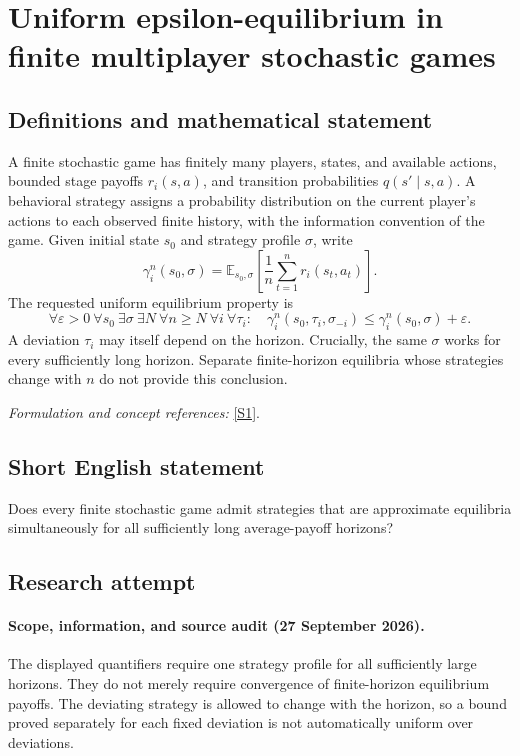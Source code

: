 \documentclass[11pt]{article}
\begin{document}
\section*{\texorpdfstring{Uniform epsilon-equilibrium in finite multiplayer stochastic games}{Uniform epsilon-equilibrium in finite multiplayer stochastic games}}\label{30006946}
\subsection{Definitions and mathematical statement}
A finite stochastic game has finitely many players, states, and available actions, bounded stage payoffs $r_i(s,a)$, and transition probabilities $q(s'\mid s,a)$. A behavioral strategy assigns a probability distribution on the current player's actions to each observed finite history, with the information convention of the game. Given initial state $s_0$ and strategy profile $\sigma$, write
\[
 \gamma_i^n(s_0,\sigma)={\mathbb{E}}_{s_0,\sigma}
 \left[\frac1n\sum_{t=1}^n r_i(s_t,a_t)\right].
\]
The requested uniform equilibrium property is
\[
 \forall{\varepsilon}>0\ \forall s_0\ \exists\sigma\ \exists N\
 \forall n\ge N\ \forall i\ \forall\tau_i:\quad
 \gamma_i^n(s_0,\tau_i,\sigma_{-i})
 \le\gamma_i^n(s_0,\sigma)+{\varepsilon}.
\]
A deviation $\tau_i$ may itself depend on the horizon. Crucially, the same $\sigma$ works for every sufficiently long horizon. Separate finite-horizon equilibria whose strategies change with $n$ do not provide this conclusion.
\par\smallskip\textit{Formulation and concept references:} \href{https://mathconjectures.com/conjectures/GAME-001}{[S1]}.

\subsection{Short English statement}
Does every finite stochastic game admit strategies that are approximate equilibria simultaneously for all sufficiently long average-payoff horizons?
\subsection{Research attempt}
\paragraph{Scope, information, and source audit (27 September 2026).}
The displayed quantifiers require one strategy profile for all sufficiently
large horizons. They do not merely require convergence of finite-horizon
equilibrium payoffs. The deviating strategy is allowed to change with the
horizon, so a bound proved separately for each fixed deviation is not
automatically uniform over deviations.
\end{document}

